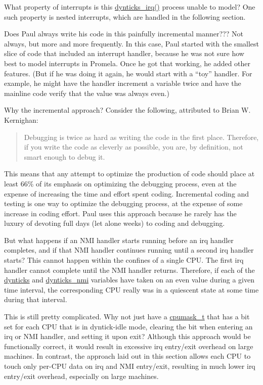 \QuickQ{}
	What property of interrupts is this \url{dynticks_irq()}
	process unable to model?
\QuickA{}
	One such property is nested interrupts,
	which are handled in the following section.

\QuickQ{}
	Does Paul always write his code in this painfully incremental
	manner???
\QuickA{}
	Not always, but more and more frequently.
	In this case, Paul started with the smallest slice of code that
	included an interrupt handler, because he was not sure how best
	to model interrupts in Promela.
	Once he got that working, he added other features.
	(But if he was doing it again, he would start with a ``toy'' handler.
	For example, he might have the handler increment a variable twice and
	have the mainline code verify that the value was always even.)

	Why the incremental approach?
	Consider the following, attributed to Brian W. Kernighan:

	\begin{quote}
		Debugging is twice as hard as writing the code in the first
		place. Therefore, if you write the code as cleverly as possible,
		you are, by definition, not smart enough to debug it.
	\end{quote}

	This means that any attempt to optimize the production of code should
	place at least 66\% of its emphasis on optimizing the debugging process,
	even at the expense of increasing the time and effort spent coding.
	Incremental coding and testing is one way to optimize the debugging
	process, at the expense of some increase in coding effort.
	Paul uses this approach because he rarely has the luxury of
	devoting full days (let alone weeks) to coding and debugging.

\QuickQ{}
	But what happens if an NMI handler starts running before
	an irq handler completes, and if that NMI handler continues
	running until a second irq handler starts?
\QuickA{}
	This cannot happen within the confines of a single CPU.
	The first irq handler cannot complete until the NMI handler
	returns.
	Therefore, if each of the \url{dynticks} and \url{dynticks_nmi}
	variables have taken on an even value during a given time
	interval, the corresponding CPU really was in a quiescent
	state at some time during that interval.

\QuickQ{}
	This is still pretty complicated.
	Why not just have a \url{cpumask_t} that has a bit set for
	each CPU that is in dyntick-idle mode, clearing the bit
	when entering an irq or NMI handler, and setting it upon
	exit?
\QuickA{}
	Although this approach would be functionally correct, it
	would result in excessive irq entry/exit overhead on
	large machines.
	In contrast, the approach laid out in this section allows
	each CPU to touch only per-CPU data on irq and NMI entry/exit,
	resulting in much lower irq entry/exit overhead, especially
	on large machines.


